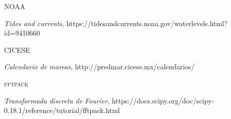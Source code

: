 \documentclass[12pt]{article}
\begin{document}
\begin{thebibliography}{9}



 \textsc{NOAA}

\textit{Tides and currents}, https://tidesandcurrents.noaa.gov/waterlevels.html?id=9410660 



 \textsc{CICESE}

\textit{Calendario de mareas}, http://predmar.cicese.mx/calendarios/





 \textsc{fftpack}

\textit{Transformada discreta de Fourier}, https://docs.scipy.org/doc/scipy-0.18.1/reference/tutorial/fftpack.html























\end{thebibliography}
\end{document}
